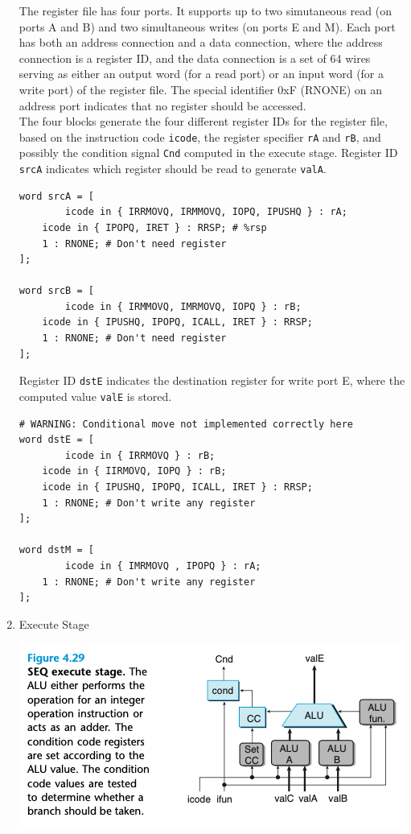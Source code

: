 \documentclass[11pt]{article}
\begin{document}
\begin{enumerate}
The register file has four ports. It supports up to two simutaneous read (on ports A and B) and two simultaneous writes (on ports E and M). Each port has both an address connection and a data connection, where the address connection is a register ID, and the data connection is a set of 64 wires serving as either an output word (for a read port) or an input word (for a write port) of the register file. The special identifier 0xF (RNONE) on an address port indicates that no register should be accessed.\\

The four blocks generate the four different register IDs for the register file, based on the instruction code \texttt{icode}, the  register specifier \texttt{rA} and \texttt{rB}, and possibly the condition signal \texttt{Cnd} computed in the execute stage. Register ID \texttt{srcA} indicates which register should be read to generate \texttt{valA}.\\

\begin{verbatim}
word srcA = [
        icode in { IRRMOVQ, IRMMOVQ, IOPQ, IPUSHQ } : rA;
	icode in { IPOPQ, IRET } : RRSP; # %rsp
	1 : RNONE; # Don't need register
];

word srcB = [
        icode in { IRMMOVQ, IMRMOVQ, IOPQ } : rB;
	icode in { IPUSHQ, IPOPQ, ICALL, IRET } : RRSP;
	1 : RNONE; # Don't need register
];
\end{verbatim}

Register ID \texttt{dstE} indicates the destination register for write port E, where the computed value \texttt{valE} is stored.\\
\begin{verbatim}
# WARNING: Conditional move not implemented correctly here
word dstE = [
        icode in { IRRMOVQ } : rB;
	icode in { IIRMOVQ, IOPQ } : rB;
	icode in { IPUSHQ, IPOPQ, ICALL, IRET } : RRSP;
	1 : RNONE; # Don't write any register
];

word dstM = [
        icode in { IMRMOVQ , IPOPQ } : rA;
	1 : RNONE; # Don't write any register
];
\end{verbatim}

\item Execute Stage
\label{sec:org4289fcc}

\begin{center}
\includegraphics[width=.9\linewidth]{pics/figure4.29-execute-stage.png}
\end{center}


\end{enumerate}
\end{document}

